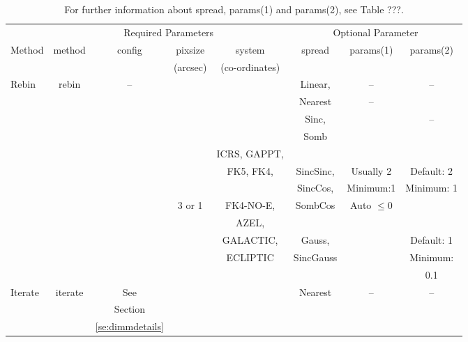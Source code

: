 \documentclass[twoside,11pt]{article}
\renewcommand{\_}{\texttt{\symbol{95}}}
\begin{document}
\begin{table}
\begin{tabular}{lccccccc}
\hline
        & \multicolumn{4}{c}{Required Parameters}           & \multicolumn{3}{c}{Optional Parameter} \\
Method & method    &  config   &    pixsize   &   system         &  spread    & params(1) & params(2) \\
       &           &           &   (arcsec)   &  (co-ordinates)  &            &           & \\
\hline
Rebin  & rebin     &  --       &              &                  &  Linear,   &   --      & -- \\
       &           &           &              &                  &  Nearest   &     --       & \\
       &           &           &              &                  &  Sinc,     &              &   -- \\
       &           &           &              &                  &  Somb      &              & \\
       &           &           &              &   ICRS, GAPPT,   &            &              & \\
       &           &           &              &   FK5, FK4,      &  SincSinc, &  Usually 2   &  Default: 2\\
       &           &           &              &                  &  SincCos,  &  Minimum:1   &  Minimum: 1\\
       &           &           &      3 or 1  &   FK4-NO-E,      &  SombCos   & Auto $\leq$0 & \\
       &           &           &              &   AZEL,          &            &              & \\
       &           &           &              &   GALACTIC,      &  Gauss,    &              &   Default: 1\\
       &           &           &              &   ECLIPTIC       &  SincGauss &              &   Minimum:\\
       &           &           &              &                  &            &              &           0.1\\
\hline
Iterate& iterate   &    See    &              &                  &  Nearest   &     --       &   -- \\
       &           &    Section&              &                  &            &              & \\
       &           &\ref{se:dimmdetails}&    &                  &            &              & \\
\hline
\end{tabular}
\caption{For further information about spread, params(1) and params(2), see Table ???.}
\label{tab:makemap}
\end{table}
\end{document}
